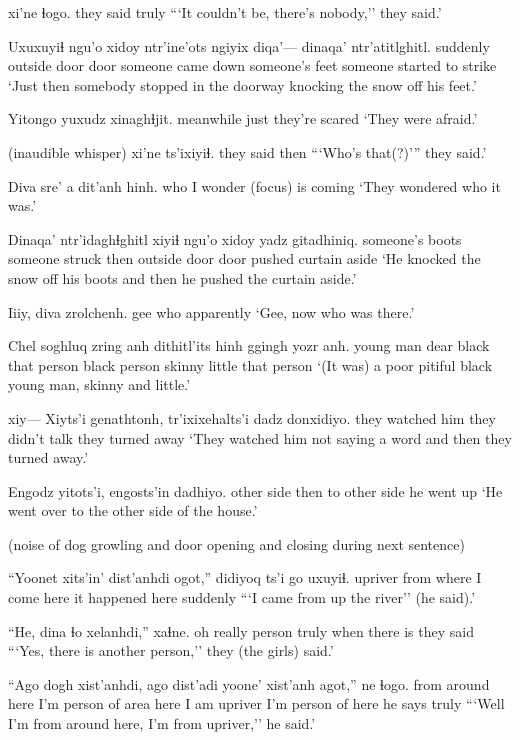 \documentclass[12pt]{article}
\begin{document}
 xi'ne ɬogo.
{} {they said} truly
\glt ```It couldn't be, there's nobody,'' they said.'
\glend

\gll Uxuxuyiɬ ngu'o xidoy ntr'ine'ots ngiyix diqa'--- dinaqa' ntr'atitlghitl.
suddenly {outside door} door {someone came } down {} {someone's feet} {someone started to strike}
\glt `Just then somebody stopped in the doorway knocking the snow off his feet.'
\glend

\gll Yitongo yuxudz xinaghɬjit.
meanwhile just {they're scared}
\glt `They were afraid.'
\glend

(inaudible whisper)
 xi'ne ts'ixiyiɬ.
{} {they said} then
\glt ```Who's that(?)''' they said.'
\glend

\gll Diva sre' a {dit'anh hinh}.
who {I wonder} {(focus)} {is coming}
\glt `They wondered who it was.'
\glend

\gll Dinaqa' ntr'idaghɬghitl xiyiɬ ngu'o xidoy {yadz gitadhiniq.}
{someone's boots} {someone struck} then {outside door} door {pushed curtain aside}
\glt `He knocked the snow off his boots and then he pushed the curtain aside.'
\glend

\gll Iiiy, diva zrolchenh.
gee who apparently
\glt `Gee, now who was there.'
\glend

\gll Chel soghluq zring anh {dithitl'its hinh} ggingh yozr anh.
{young man} dear black {that person} {black person} skinny little {that person}
\glt `(It was) a poor pitiful black young man, skinny and little.'
\glend

\gll xiy--- {Xiyts'i genathtonh,} tr'ixixehalts'i {dadz donxidiyo.}
{} {they watched him} {they didn't talk} {they turned away}
\glt `They watched him not saying a word and then they turned away.'
\glend

\gll Engodz yitots'i, engosts'in dadhiyo.
{other side} then {to other side} {he went up}
\glt `He went over to the other side of the house.'
\glend

(noise of dog growling and door opening and closing during next sentence)

\gll ``Yoonet xits'in' dist'anhdi ogot,'' didiyoq ts'i go uxuyiɬ.
{upriver} from {where I come} here {it happened} {} here suddenly
\glt ```I came from up the river'' (he said).'
\glend

\gll ``He, dina ɬo xelanhdi,'' xaɬne.
{oh really} person truly {when there is} {they said}
\glt ```Yes, there is another person,'' they (the girls) said.'
\glend

\gll ``{Ago dogh} xist'anhdi, ago dist'adi yoone' xist'anh agot,'' ne ɬogo.
{from around here} {I'm person of area} {here} {I am} upriver {I'm person of} here {he says} truly
\glt ```Well I'm from around here, I'm from upriver,'' he said.'
\glend
\end{document}
